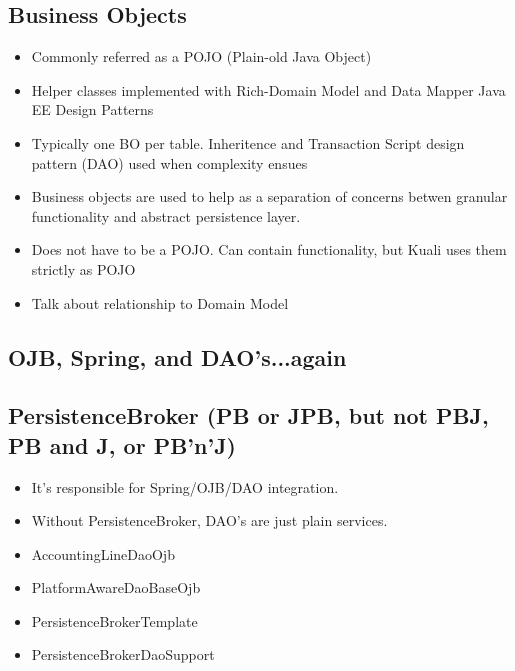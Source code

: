 \begin{ifhtml}
    \begin{s5slide}
      \section{Business Objects}
      \begin{itemize}
        \item Commonly referred as a POJO (Plain-old Java Object)
        \item Helper classes implemented with Rich-Domain Model and Data Mapper Java EE Design Patterns
        \item Typically one BO per table. Inheritence and Transaction Script design pattern (DAO) used when complexity ensues
      \end{itemize}
      \begin{s5notes}
        \begin{itemize}
          \item Business objects are used to help as a separation of concerns betwen granular functionality and abstract persistence layer.
          \item Does not have to be a POJO. Can contain functionality, but Kuali uses them strictly as POJO
          \item Talk about relationship to Domain Model
        \end{itemize}
        \begin{slideshow}
        \item {}
        \end{slideshow}
        \end{s5notes}
    \end{s5slide}

    \begin{s5slide}
      \section{OJB, Spring, and DAO's...again}
      \subsection{PersistenceBroker (PB or JPB, but not PBJ, PB and J, or PB'n'J)}
      \begin{itemize}
      \item It's responsible for Spring/OJB/DAO integration. 
      \item Without PersistenceBroker, DAO's are just plain services.
      \item {}AccountingLineDaoOjb
      \item {}PlatformAwareDaoBaseOjb
      \item {}PersistenceBrokerTemplate
      \item {}PersistenceBrokerDaoSupport 
      \end{itemize}
      

\end{s5slide}
\end{ifhtml}
